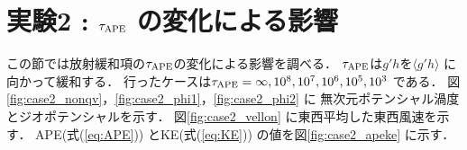\documentclass[a4j,12pt,openbib,oneside]{jreport}
\begin{document}
\section{実験2 : $\tau_{\rm{APE}}$ の変化による影響}
\label{sec:case2}
この節では放射緩和項の$\tau_{\rm{APE}}$の変化による影響を調べる．
$\tau_{\rm{APE}}$は$g'h$を$\langle g'h \rangle $ に向かって緩和する．
行ったケースは$\tau_{\rm{APE}} = \infty, 10^8, 10^7, 10^6, 10^5, 10^3$ である．
%
%
%
図\ref{fig:case2_nonqv}，\ref{fig:case2_phi1}，\ref{fig:case2_phi2} に
無次元ポテンシャル渦度とジオポテンシャルを示す．
%
%
%
図\ref{fig:case2_vellon} に東西平均した東西風速を示す．
%
APE(式(\ref{eq:APE})) とKE(式(\ref{eq:KE})) の値を図\ref{fig:case2_apeke} に示す．
%
\end{document}
